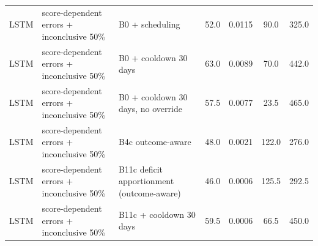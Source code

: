 \documentclass[10pt,onecolumn,letterpaper]{article}
\begin{document}
\begin{longtable}{lp{5.2cm}p{4.4cm}cccc}
LSTM & score-dependent errors + inconclusive 50\% & B0 + scheduling & 52.0 & 0.0115 & 90.0 & 325.0 \\
LSTM & score-dependent errors + inconclusive 50\% & B0 + cooldown 30 days & 63.0 & 0.0089 & 70.0 & 442.0 \\
LSTM & score-dependent errors + inconclusive 50\% & B0 + cooldown 30 days, no override & 57.5 & 0.0077 & 23.5 & 465.0 \\
LSTM & score-dependent errors + inconclusive 50\% & B4c outcome-aware & 48.0 & 0.0021 & 122.0 & 276.0 \\
LSTM & score-dependent errors + inconclusive 50\% & B11c deficit apportionment (outcome-aware) & 46.0 & 0.0006 & 125.5 & 292.5 \\
LSTM & score-dependent errors + inconclusive 50\% & B11c + cooldown 30 days & 59.5 & 0.0006 & 66.5 & 450.0 \\
\bottomrule
\end{longtable}
\end{document}
